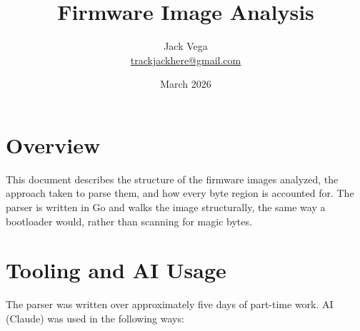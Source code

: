 \documentclass[11pt,a4paper]{article}
\title{Firmware Image Analysis}
\author{Jack Vega \\ \href{mailto:trackjackhere@gmail.com}{trackjackhere@gmail.com}}
\date{March 2026}
\begin{document}
\maketitle
\tableofcontents
\newpage

\section{Overview}

This document describes the structure of the firmware images analyzed, the
approach taken to parse them, and how every byte region is accounted for.
The parser is written in Go and walks the image structurally, the same
way a bootloader would, rather than scanning for magic bytes.

\section{Tooling and AI Usage}

The parser was written over approximately five days of part-time work. AI
(Claude) was used in the following ways:
\end{document}
